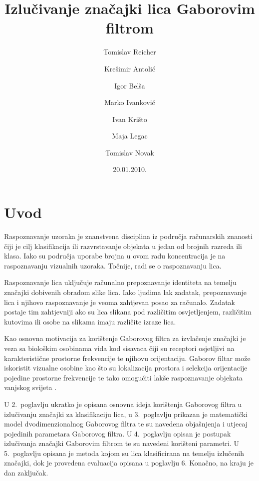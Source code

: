 \documentclass{ru}
\begin{document}
\title{Izlučivanje značajki lica Gaborovim filtrom}
\author{Tomislav Reicher \and Krešimir Antolić \and Igor Belša \and Marko Ivanković \and Ivan Krišto \and Maja Legac \and Tomislav Novak}
\date{20.01.2010.}
\maketitle

\newpage

\tableofcontents

\chapter{Uvod}
Raspoznavanje uzoraka je znanstvena disciplina iz područja računarskih znanosti
čiji je cilj klasifikacija ili razvrstavanje objekata u jedan od brojnih razreda
ili klasa. Iako su područja uporabe brojna u ovom radu koncentracija je na
raspoznavanju vizualnih uzoraka. Točnije, radi se o raspoznavanju lica.

Raspoznavanje lica uključuje računalno prepoznavanje identiteta na temelju
značajki dobivenih obradom slike lica. Iako ljudima lak zadatak, prepoznavanje
lica i njihovo raspoznavanje je veoma zahtjevan posao za računalo. Zadatak
postaje tim zahtjevniji ako su lica slikana pod različitim osvjetljenjem,
različitim kutovima ili osobe na slikama imaju različite izraze lica.

Kao osnovna motivacija za korištenje Gaborovog filtra za izvlačenje značajki je
veza sa biološkim osobinama vida kod sisavaca čiji su receptori osjetljivi na
karakteristične prostorne frekvencije te njihovu orijentaciju. Gaborov filtar
može iskoristit vizualne osobine kao što su lokalizacija prostora i selekcija
orijentacije pojedine prostorne frekvencije te tako omogućiti lakše
raspoznavanje objekata vanjskog svijeta
\citep{bhuiyan2007onfacerecognition}\nocite{daugman1985uncertainty}.

U 2.~poglavlju ukratko je opisana osnovna ideja korištenja Gaborovog
filtra u izlučivanju značajki za klasifikaciju lica, u 3.~poglavlju prikazan je
matematički model dvodimenzionalnog Gaborovog filtra te su navedena objašnjenja
i utjecaj pojedinih parametara Gaborovog filtra. U 4.~poglavlju opisan je
postupak izlučivanja značajki Gaborovim filtrom te su navedeni korišteni
parametri. U 5.~poglavlju opisana je metoda kojom su lica klasificirana na temelju
izlučenih značajki, dok je provedena evaluacija opisana u poglavlju
6. Konačno, na kraju je dan zaključak.
\end{document}
